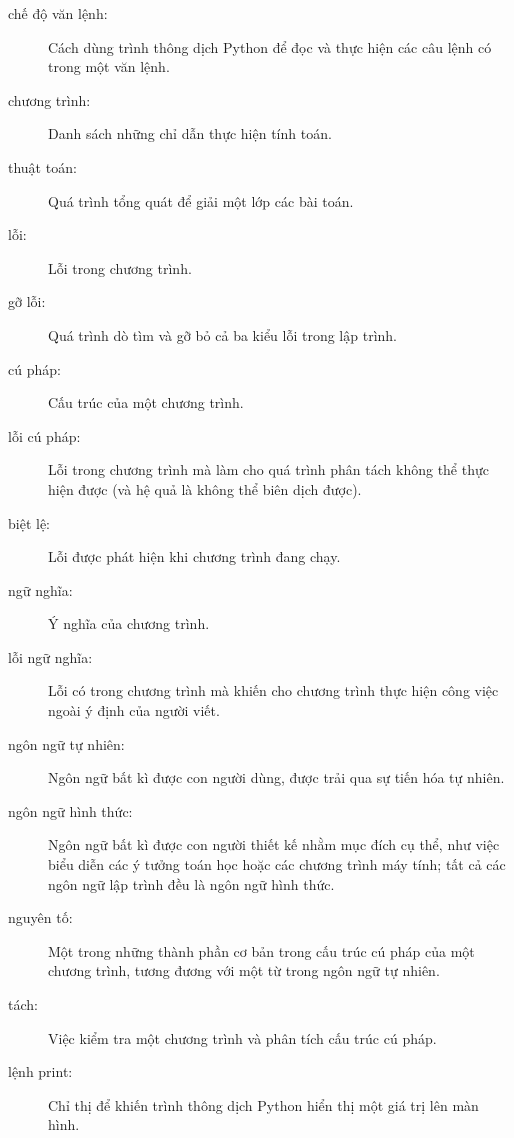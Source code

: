 \documentclass[11pt]{book}
\begin{document}
\begin{description}
\item[chế độ văn lệnh:] Cách dùng trình thông dịch Python để đọc
và thực hiện các câu lệnh có trong một văn lệnh.

\item[chương trình:] Danh sách những chỉ dẫn thực hiện tính toán.

\item[thuật toán:]  Quá trình tổng quát để giải một lớp các
bài toán.

\item[lỗi:]  Lỗi trong chương trình.

\item[gỡ lỗi:]  Quá trình dò tìm và gỡ bỏ cả ba kiểu lỗi trong lập trình.

\item[cú pháp:]  Cấu trúc của một chương trình.

\item[lỗi cú pháp:]  Lỗi trong chương trình mà làm cho quá trình
phân tách không thể thực hiện được (và hệ quả là không thể biên dịch được).

\item[biệt lệ:]  Lỗi được phát hiện khi chương trình đang chạy.

\item[ngữ nghĩa:]  Ý nghĩa của chương trình.

\item[lỗi ngữ nghĩa:]   Lỗi có trong chương trình mà khiến cho
chương trình thực hiện công việc ngoài ý định của người viết.

\item[ngôn ngữ tự nhiên:]  Ngôn ngữ bất kì được con người dùng,
được trải qua sự tiến hóa tự nhiên.

\item[ngôn ngữ hình thức:]  Ngôn ngữ bất kì được con người
thiết kế nhằm mục đích cụ thể, như việc biểu diễn các ý tưởng toán học
hoặc các chương trình máy tính; tất cả các ngôn ngữ lập trình đều là
ngôn ngữ hình thức.

\item[nguyên tố:]  Một trong những thành phần cơ bản trong cấu trúc
cú pháp của một chương trình, tương đương với một từ trong ngôn ngữ
tự nhiên.

\item[tách:]  Việc kiểm tra một chương trình và phân tích cấu
trúc cú pháp.

\item[lệnh print:]  Chỉ thị để khiến trình thông dịch Python
hiển thị một giá trị lên màn hình.


\end{description}
\end{document}
